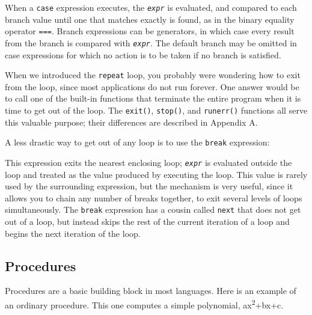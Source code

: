
When a \texttt{case} expression executes, the \texttt{\textit{expr}} is
evaluated, and compared to each branch value until one that matches
exactly is found, as in the binary equality operator \texttt{===}.
Branch expressions can be generators, in which case every result from
the branch is compared with \texttt{\textit{expr}}. The default branch
may be omitted in case expressions for which no action is to be taken
if no branch is satisfied.

When we introduced the \texttt{repeat} loop, you probably were wondering
how to exit from the loop, since most applications do not run forever.
One answer would be to call one of the built-in functions that
terminate the entire program when it is time to get out of the loop.
The \texttt{exit()}, \texttt{stop()}, and \texttt{runerr()} functions
all serve this valuable purpose; their differences are described in
Appendix A.

A less drastic way to get out of any loop is to use the \texttt{break} expression:


This expression exits the nearest enclosing loop; \texttt{\textit{expr}}
is evaluated outside the loop and treated as the value produced by
executing the loop. This value is rarely used by the surrounding
expression, but the mechanism is very useful, since it allows you to
chain any number of breaks together, to exit several levels of loops
simultaneously. The \texttt{break} expression has a cousin called
\texttt{next} that does not get out of a loop, but instead skips the
rest of the current iteration of a loop and begins the next iteration
of the loop.

\subsection[Procedures]{Procedures}
Procedures are a basic building block in most
languages. Here is an example of an ordinary procedure. This one
computes a simple polynomial, ax\textsuperscript{2}+bx+c.

